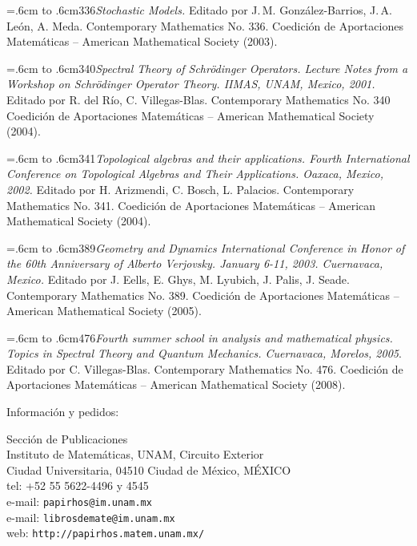 \documentclass[10pt,pagesize]{scrbook}
\numberwithin{equation}{chapter}
\def\bibl#1{\hangindent=.6cm \noindent \hbox to .6cm{#1\hfill}}
\begin{document}
\bibl{336}{\itshape Stochastic Models.}
Editado por J.\,M. González-Barrios, J.\,A. León, A. Meda. 
Contemporary Mathematics No. 336. 
Coedición de Aportaciones Matemáticas -- American Mathematical
Society (2003). %

\bibl{340}{\itshape Spectral Theory of Schr\"odinger Operators.
  Lecture Notes from a Workshop on Schr\"odinger Operator
  Theory. IIMAS, UNAM, Mexico, 2001.}
Editado por R. del Río, C. Villegas-Blas.
Contemporary Mathematics No. 340
Coedición de Aportaciones Matemáticas -- American Mathematical
Society (2004). %

\bibl{341}{\itshape Topological algebras and their applications. 
  Fourth International Conference on Topological Algebras
  and Their Applications. Oaxaca, Mexico, 2002.}
Editado por H. Arizmendi, C. Bosch, L. Palacios.
Contemporary Mathematics No. 341.
Coedición de Aportaciones Matemáticas -- American 
Mathematical Society (2004). %

\bibl{389}{\itshape Geometry and Dynamics International Conference in
  Honor of the 60th Anniversary of Alberto Verjovsky. January 6-11, 
  2003. Cuernavaca, Mexico.}
Editado por J. Eells, E. Ghys, M. Lyubich, J. Palis,
  J. Seade. 
Contemporary Mathematics No. 389.
Coedición de Aportaciones Matemáticas -- American Mathematical
Society (2005). %

\bibl{476}{\itshape Fourth summer school in analysis and mathematical physics.
Topics in  Spectral Theory and Quantum Mechanics.
Cuernavaca, Morelos, 2005}. 
Editado por C. Villegas-Blas. 
Contemporary Mathematics No. 476. 
Coedición de Aportaciones Matemáticas -- American Mathematical Society (2008).

\vskip15pt\vfill

\parbox{\linewidth}{Información y pedidos:

\vskip5pt
\begin{centering}
  Sección de Publicaciones\\
  Instituto de Matemáticas, UNAM, Circuito Exterior\\
  Ciudad Universitaria, 04510 Ciudad de México, MÉXICO\\
  tel: +52 55 5622-4496 y 4545\\
  e-mail: \texttt{papirhos@im.unam.mx}\\
  e-mail: \texttt{librosdemate@im.unam.mx}\\
  web: \texttt{http://papirhos.matem.unam.mx/}\\
\end{centering}}
\end{document}
